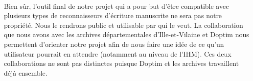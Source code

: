 \paragraph{}
Bien sûr, l’outil final de notre projet qui a pour but d’être compatible avec plusieurs
types de reconnaisseurs d’écriture manuscrite ne sera pas notre propriété. Nous le rendrons
public et utilisable par qui le veut. La collaboration que nous avons avec les archives
départementales d’Ille-et-Vilaine et Doptim nous permettent d’orienter notre projet afin de
nous faire une idée de ce qu’un utilisateur pourrait en attendre (notamment au niveau de l’IHM).
Ces deux collaborations ne sont pas distinctes puisque Doptim et les archives travaillent déjà ensemble.